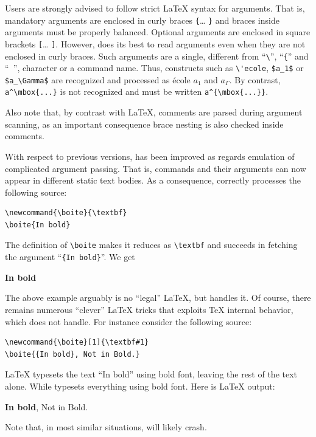 Users are strongly advised to follow strict \LaTeX{} syntax for
arguments. That is, mandatory arguments are enclosed in curly braces
\verb+{+\ldots{} \verb+}+ and braces inside arguments must be properly
balanced.
Optional arguments are enclosed in square brackets \verb+[+\ldots{}
\verb+]+.
However, \hevea{} does its best to read arguments even when they are
not enclosed in curly braces.
Such arguments are a single, different from ``\verb+\+'', ``\verb+{+''
and ``\verb+ +'', character or
a command name.
Thus, constructs such as \verb+\'ecole+,
\verb+$a_1$+ or \verb+$a_\Gamma$+ are
recognized and processed as \'ecole $a_1$ and $a_\Gamma$.
By contrast, \verb+a^\mbox{...}+ is not recognized
and must be written  \verb+a^{\mbox{...}}+.

Also note that, by contrast with \LaTeX{}, comments are parsed during
argument scanning, as an important consequence brace nesting is also
checked inside comments.

With respect to previous versions,
\hevea{} has been improved as regards emulation of complicated
argument passing. That is,
commands and their arguments can now appear in
different static text bodies. As a consequence,
\hevea{} correctly processes the following source:
\begin{verbatim}
\newcommand{\boite}{\textbf}
\boite{In bold}
\end{verbatim}
The definition of \verb+\boite+ makes it reduces as
\verb+\textbf+ and \hevea{} succeeds in fetching the argument
``\verb+{In bold}+''. We get
\begin{htmlout}
\newcommand{\boite}{\textbf}
\boite{In bold}
\end{htmlout}

The above example arguably is no ``legal'' \LaTeX{},
but \hevea{} handles it.
Of course, there remains
numerous ``clever'' \LaTeX{} tricks that exploits \TeX{} internal
behavior, which \hevea{} does not handle.
For instance consider the following source:
\begin{verbatim}
\newcommand{\boite}[1]{\textbf#1}
\boite{{In bold}, Not in Bold.}
\end{verbatim}
\LaTeX{} typesets the text ``In bold'' using bold font, leaving
the rest of the text alone. While \hevea{} typesets everything using
bold font. Here is \ifhevea\hevea\else\LaTeX\fi{} output:
\begin{htmlout}
\newcommand{\boite}[1]{\textbf#1}
\boite{{In bold}, Not in Bold.}
\end{htmlout}
Note that, in most similar situations, \hevea{} will likely crash.


